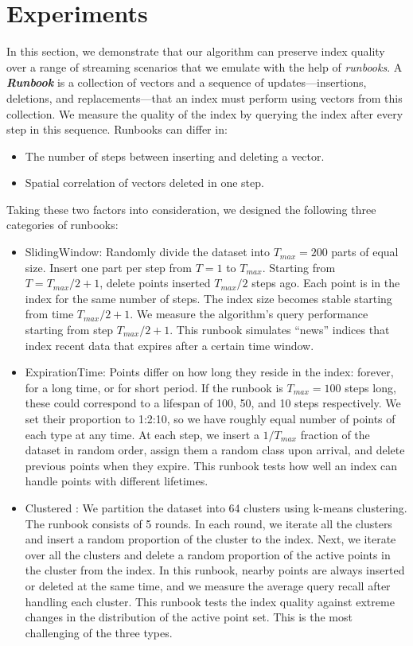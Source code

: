 
\section{Experiments}
\label{sec:experiments}
In this section, we demonstrate that our \name algorithm can preserve index quality
over a range of streaming scenarios that we emulate with the help of \emph{runbooks}.
A \emph{\textbf{Runbook}} is a collection of vectors and a sequence of updates---insertions, deletions, and 
replacements---that an index must perform using vectors from this collection. 
We measure the quality of the index by querying the index after every step in this sequence.
Runbooks can differ in:
\begin{itemize}[leftmargin=*]
\item The number of steps between inserting and deleting a vector.
\item Spatial correlation of vectors deleted in one step.
\end{itemize}

Taking these two factors into consideration, we designed the following three categories of runbooks:

\begin{itemize}[leftmargin=*]
    \item{SlidingWindow:} Randomly divide the dataset into $T_{max}=200$ parts of equal size.
    Insert one part per step from $T=1$ to $T_{max}$.
    Starting from $T=T_{max}/2+1$, delete points inserted $T_{max}/2$ steps ago.
    Each point is in the index for the same number of steps.
    The index size becomes stable starting from time $T_{max}/2+1$. 
    We measure the algorithm's query performance starting from step $T_{max}/2+1$.
    This runbook simulates  ``news'' indices that index recent data that expires after a certain time window.
    \item{ExpirationTime:} Points differ on how long they reside in the index:
    forever, for a long time, or for short period.  If the runbook is $T_{max}=100$ steps long,
    these could correspond to a lifespan of 100, 50, and 10 steps respectively. We set
    their proportion to 1:2:10, so we have roughly equal number
    of points of each type at any time.
    At each step, we insert a $1/T_{max}$ fraction of the dataset
    in random order, assign them a random class upon arrival,
    and delete previous points when they expire.
    This runbook tests how well an index can handle points with different lifetimes.
    \item{Clustered \cite{simhadri2024resultsbigannneurips23}:} We partition the dataset into 64 clusters using k-means clustering.
    The runbook consists of 5 rounds. In each round, we iterate all the clusters and insert
    a random proportion of the cluster to the index. Next, we iterate over all the clusters
    and delete a random proportion of the active points in the cluster from the index.
    In this runbook, nearby points are always inserted or deleted at the same time,
    and we measure the average query recall after handling each cluster. This runbook
    tests the index quality against extreme changes in the distribution of the active point set. This is the most challenging of the three types.
\end{itemize}
 

